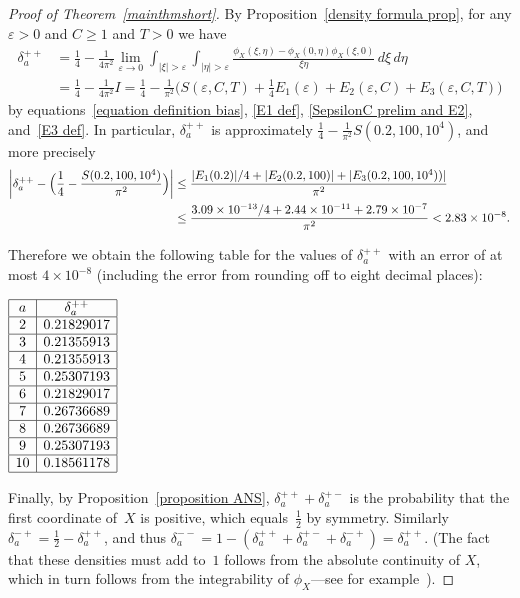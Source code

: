 \documentclass[11pt]{article}
\theoremstyle{plain}
\theoremstyle{definition}
\numberwithin{equation}{section}
\newcommand{\0}{{\vec 0}}
\begin{document}
\begin{proof}[Proof of Theorem~\ref{mainthmshort}]
By Proposition~\ref{density formula prop}, for any $\varepsilon>0$ and $C\ge1$ and $T>0$ we have
\begin{align*}
\delta^{++}_a &= \frac1{4} - \frac1{4\pi^2} \lim_{\varepsilon\rightarrow 0}\int_{|\xi|>\varepsilon} \int_{|\eta|>\varepsilon}\frac{\phi_X(\xi,\eta)-\phi_X(0,\eta)\phi_X(\xi,0)}{\xi\eta}\,d\xi\,d\eta \\
&= \frac1{4} - \frac1{4\pi^2} I = \frac1{4} - \frac1{\pi^2} \bigl( S(\varepsilon,C,T) + \frac1{4}E_1(\varepsilon) + E_2(\varepsilon,C) + E_3(\varepsilon,C,T) \bigr)
\end{align*}
by equations~\eqref{equation definition bias}, \eqref{E1 def}, \eqref{SepsilonC prelim and E2}, and~\eqref{E3 def}. In particular, $\delta^{++}_a$ is approximately $\frac14-\frac1{\pi^2} S(0.2,100,10^4)$, and more precisely
\begin{align*}
\biggl| \delta^{++}_a - \Bigl( \frac14-\frac{S(0.2,100,10^4)}{\pi^2} \Bigr) \biggr| &\le \frac{|E_1(0.2)|/4 + |E_2(0.2,100)| + |E_3(0.2,100,10^4))|}{\pi^2} \\
&\le \frac{3.09\times10^{-13}/4 + 2.44\times 10^{-11} + 2.79\times10^{-7}}{\pi^2} < 2.83 \times 10^{-8}.
\end{align*}



Therefore we obtain the following table for the values of $\delta_a^{++}$ with an error of at most $4 \times10^{-8}$ (including the error from rounding off to eight decimal places):

\begin{center}
$\begin{array}{ |c|c| } 
\hline
a & \delta_a^{++} \\  \hline
2 &0.21829017 \\ \hline
3 &0.21355913 \\ \hline
4 &0.21355913 \\ \hline
5 &0.25307193 \\ \hline
6 &0.21829017 \\ \hline
7 &0.26736689 \\ \hline
8 &0.26736689 \\ \hline
9 &0.25307193 \\ \hline
10&0.18561178 \\ \hline
\end{array}$
\end{center}

Finally, by Proposition~\ref{proposition ANS}, $\delta_a^{++} + \delta_a^{+-}$ is the probability that the first coordinate of~$X$ is positive, which equals~$\frac12$ by symmetry. Similarly $\delta_a^{-+} = \frac12 - \delta_a^{++}$, and thus $\delta_a^{--} = 1 - (\delta_a^{++} + \delta_a^{+-} + \delta_a^{-+}) = \delta_a^{++}$. (The fact that these densities must add to~$1$ follows from the absolute continuity of $X$, which in turn follows from the integrability of $\phi_X$---see for example~\cite[Proposition~4.6]{MN}).
\end{proof}
\end{document}
